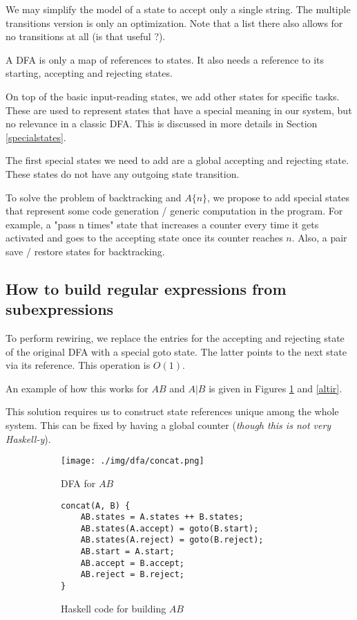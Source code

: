 \documentclass[11pt,a4paper]{report}
\newcommand{\regexp}[1]{$#1$}
\begin{document}
We may simplify the model of a state to accept only a single string. The multiple transitions version is only an optimization. Note that a list there also allows for no transitions at all (is that useful ?).

A DFA is only a map of references to states. It also needs a reference to its starting, accepting and rejecting states.

On top of the basic input-reading states, we add other states for specific tasks. These are used to represent states that have a special meaning in our system, but no relevance in a classic DFA. This is discussed in more details in Section \ref{specialstates}.

The first special states we need to add are a global accepting and rejecting state. These states do not have any outgoing state transition.

To solve the problem of backtracking and \regexp{A\{n\}}, we propose to add special states that represent some code generation / generic computation in the program. For example, a "pass n times" state that increases a counter every time it gets activated and goes to the accepting state once its counter reaches $n$. Also, a pair save / restore states for backtracking.


\subsection{How to build regular expressions from subexpressions}

To perform rewiring, we replace the entries for the accepting and rejecting state of the original DFA with a special \textsf{goto} state. The latter points to the next state via its reference. This operation is $O(1)$.

An example of how this works for \regexp{AB} and \regexp{A|B} is given in Figures \ref{concatir} and \ref{altir}.

This solution requires us to construct state references unique among the whole system. This can be fixed by having a global counter (\textit{though this is not very Haskell-y}).


\begin{figure}[h]
	\begin{subfigure}[h]{0.45\textwidth}
		\centering
		\texttt{[image: ./img/dfa/concat.png]}
		\caption{DFA for \regexp{AB}}
	\end{subfigure}
	\hspace{0.05\textwidth}
	\begin{subfigure}[h]{0.45\textwidth}
		\centering
		\begin{lstlisting}[style=C]
concat(A, B) {
	AB.states = A.states ++ B.states;
	AB.states(A.accept) = goto(B.start);
	AB.states(A.reject) = goto(B.reject);
	AB.start = A.start;
	AB.accept = B.accept;
	AB.reject = B.reject;
}
		\end{lstlisting}
		\caption{Haskell code for building \regexp{AB}}
	\end{subfigure}
	\caption{}
	\label{concatir}
\end{figure}
\end{document}
